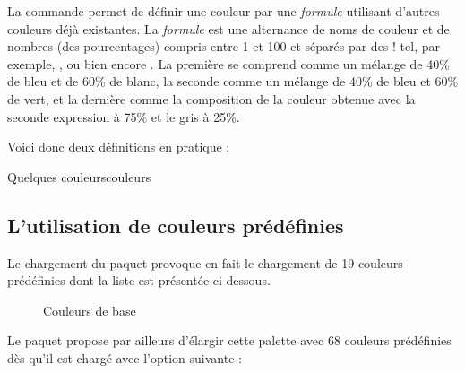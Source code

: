 La commande  permet de définir une couleur par une \emph{formule} utilisant d'autres couleurs déjà existantes. La \emph{formule} est une alternance de noms de couleur et de nombres (des pourcentages) compris entre 1 et 100 et séparés par des \og \string! \fg tel, par exemple, ,  ou bien encore . La première se comprend comme un mélange de 40\% de bleu et de 60\% de blanc, la seconde comme un mélange de 40\% de bleu et 60\% de vert, et la dernière comme la composition de la couleur obtenue avec la seconde expression à 75\% et le gris à 25\%.

Voici donc deux définitions en pratique :

\begin{codesimple}{Quelques couleurs}{couleurs}
\end{codesimple}

\subsection{L'utilisation de couleurs prédéfinies}

Le chargement du paquet  provoque en fait le chargement de 19 couleurs prédéfinies dont la liste est présentée ci-dessous. 

\begin{figure}[H]
\raggedright
\begin{multicols}{3}
\end{multicols}
\caption{Couleurs de base}
\end{figure}

Le paquet  propose par ailleurs d'élargir cette palette avec 68 couleurs prédéfinies dès qu'il est chargé avec l'option suivante :
\begin{center}
\end{center}

